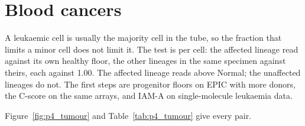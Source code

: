 \section{Blood cancers}

A leukaemic cell is usually the majority cell in the tube, so the fraction that limits a minor cell does not limit it. The test is per cell: the affected
lineage read against its own healthy floor, the other lineages in the same specimen against theirs, each against 1.00. \prediction{} The affected lineage
reads above Normal; the unaffected lineages do not. The first steps are progenitor floors on EPIC with more donors, the C-score on the same arrays, and IAM-A on single-molecule
leukaemia data. \openprob

Figure~\ref{fig:p4_tumour} and Table~\ref{tab:p4_tumour} give every pair.


